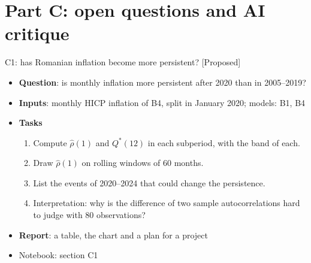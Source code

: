 \section{Part C: open questions and AI critique}

\begin{frame}{C1: has Romanian inflation become more persistent? [Proposed]}
\itemsize{\footnotesize}
\begin{itemize}
\item \textbf{Question}: is monthly inflation more persistent after 2020 than in 2005--2019?
\item \textbf{Inputs}: monthly HICP inflation of B4, split in January 2020; models: B1, B4
\item \textbf{Tasks}
\begin{enumerate}
    \item Compute $\hat\rho(1)$ and $Q^*(12)$ in each subperiod, with the band of each.
    \item Draw $\hat\rho(1)$ on rolling windows of 60 months.
    \item List the events of 2020--2024 that could change the persistence.
    \item Interpretation: why is the difference of two sample autocorrelations hard to judge with 80 observations?
\end{enumerate}
\item \textbf{Report}: a table, the chart and a plan for a project
\item Notebook: section C1
\end{itemize}
\end{frame}

